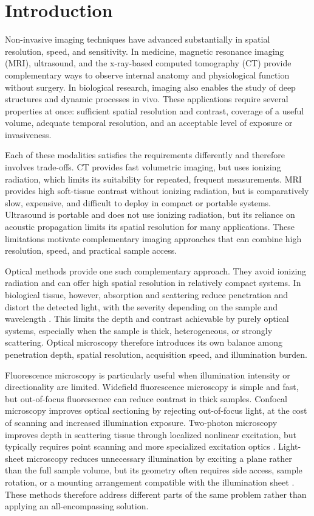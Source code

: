 \chapter{Introduction}
Non-invasive imaging techniques have advanced substantially in spatial resolution, speed, and sensitivity. In medicine, magnetic resonance imaging (MRI), ultrasound, and the x-ray-based computed tomography (CT) provide complementary ways to observe internal anatomy and physiological function without surgery. In biological research, imaging also enables the study of deep structures and dynamic processes in vivo. These applications require several properties at once: sufficient spatial resolution and contrast, coverage of a useful volume, adequate temporal resolution, and an acceptable level of exposure or invasiveness.

Each of these modalities satisfies the requirements differently and therefore involves trade-offs. CT provides fast volumetric imaging, but uses ionizing radiation, which limits its suitability for repeated, frequent measurements. MRI provides high soft-tissue contrast without ionizing radiation, but is comparatively slow, expensive, and difficult to deploy in compact or portable systems. Ultrasound is portable and does not use ionizing radiation, but its reliance on acoustic propagation limits its spatial resolution for many applications. These limitations motivate complementary imaging approaches that can combine high resolution, speed, and practical sample access.

Optical methods provide one such complementary approach. They avoid ionizing radiation and can offer high spatial resolution in relatively compact systems. In biological tissue, however, absorption and scattering reduce penetration and distort the detected light, with the severity depending on the sample and wavelength \cite{jacques2013opticalPropertiesTissues}. This limits the depth and contrast achievable by purely optical systems, especially when the sample is thick, heterogeneous, or strongly scattering. Optical microscopy therefore introduces its own balance among penetration depth, spatial resolution, acquisition speed, and illumination burden.

Fluorescence microscopy is particularly useful when illumination intensity or directionality are limited. Widefield fluorescence microscopy is simple and fast, but out-of-focus fluorescence can reduce contrast in thick samples. Confocal microscopy improves optical sectioning by rejecting out-of-focus light, at the cost of scanning and increased illumination exposure. Two-photon microscopy improves depth in scattering tissue through localized nonlinear excitation, but typically requires point scanning and more specialized excitation optics \cite{helmchen2005deepTissueTwoPhoton}. Light-sheet microscopy reduces unnecessary illumination by exciting a plane rather than the full sample volume, but its geometry often requires side access, sample rotation, or a mounting arrangement compatible with the illumination sheet \cite{swoger2007multiviewFusion,preibisch2010beadRegistration}. These methods therefore address different parts of the same problem rather than applying an all-encompassing solution.

